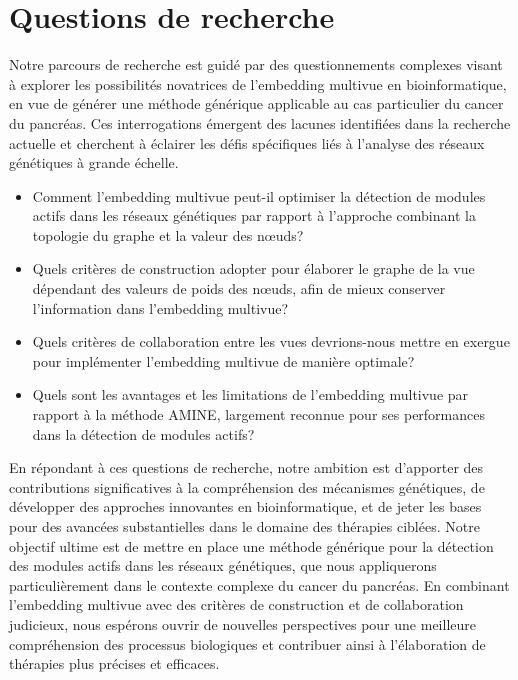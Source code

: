 \section{Questions de recherche}


Notre parcours de recherche est guidé par des questionnements complexes visant à explorer les possibilités novatrices de l'embedding multivue en bioinformatique, en vue de générer une méthode générique applicable au cas particulier du cancer du pancréas. Ces interrogations émergent des lacunes identifiées dans la recherche actuelle et cherchent à éclairer les défis spécifiques liés à l'analyse des réseaux génétiques à grande échelle.
\begin{itemize}
\item Comment l'embedding multivue peut-il optimiser la détection de modules actifs dans les réseaux génétiques par rapport à l'approche combinant la topologie du graphe et la valeur des nœuds?
                                                         
\item Quels critères de construction adopter pour élaborer le graphe de la vue dépendant des valeurs de poids des nœuds, afin de mieux conserver l'information dans l'embedding multivue?

\item Quels critères de collaboration entre les vues devrions-nous mettre en exergue pour implémenter l'embedding multivue de manière optimale?

\item Quels sont les avantages et les limitations de l'embedding multivue par rapport à la méthode AMINE, largement reconnue pour ses performances dans la détection de modules actifs?


\end{itemize}

En répondant à ces questions de recherche, notre ambition est d'apporter des contributions significatives à la compréhension des mécanismes génétiques, de développer des approches innovantes en bioinformatique, et de jeter les bases pour des avancées substantielles dans le domaine des thérapies ciblées. Notre objectif ultime est de mettre en place une méthode générique pour la détection des modules actifs dans les réseaux génétiques, que nous appliquerons particulièrement dans le contexte complexe du cancer du pancréas. En combinant l'embedding multivue avec des critères de construction et de collaboration judicieux, nous espérons ouvrir de nouvelles perspectives pour une meilleure compréhension des processus biologiques et contribuer ainsi à l'élaboration de thérapies plus précises et efficaces.